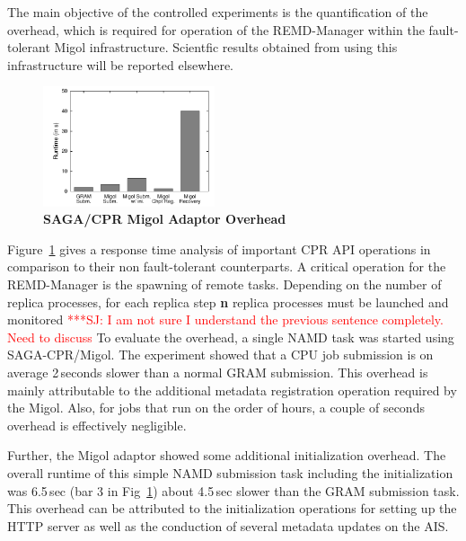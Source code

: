 \documentclass[times, 10pt, twocolumn]{article}
\newcommand{\jhanote}[1]{ {\textcolor{red} { ***SJ: #1 }}}
\newcommand{\jhanote}[1]{}
\begin{document}
  The main objective of the controlled experiments is the
  quantification of the overhead, which is required for operation of
  the REMD-Manager within the fault-tolerant Migol infrastructure.
  Scientfic results obtained from using this infrastructure will be 
  reported elsewhere.
\begin{figure}[ht]
    \centering
        \includegraphics[width=0.45\textwidth]{performance/perf_submission.pdf}
    \caption{\small \bf SAGA/CPR Migol Adaptor Overhead}
    \label{fig:performance_perf_submission}
\end{figure}           
Figure~\ref{fig:performance_perf_submission} gives a response time
analysis of important CPR API operations in comparison to their
non fault-tolerant counterparts. A critical operation for the
REMD-Manager is the spawning of remote tasks. Depending on the number
of replica processes, for each replica step {\bf n} replica processes
must be launched and monitored \jhanote{I am not sure I understand the
  previous sentence completely. Need to discuss} To evaluate the
overhead, a single NAMD task was started using SAGA-CPR/Migol.  The
experiment showed that a CPU job submission is on average 2\,seconds
slower than a normal GRAM submission. This overhead is mainly
attributable to the additional metadata registration operation
required by the Migol. Also, for jobs that run on the order of hours,
a couple of seconds overhead is effectively negligible.

Further, the Migol adaptor showed some additional initialization
overhead.  The overall runtime of this simple NAMD submission task
including the initialization was 6.5\,sec (bar 3 in
Fig~\ref{fig:performance_perf_submission}) about 4.5\,sec slower
than the GRAM submission task. This overhead can be attributed to the
initialization operations for setting up the HTTP server as well as
the conduction of several metadata updates on the AIS.
                                                                                                                    
\end{document}
